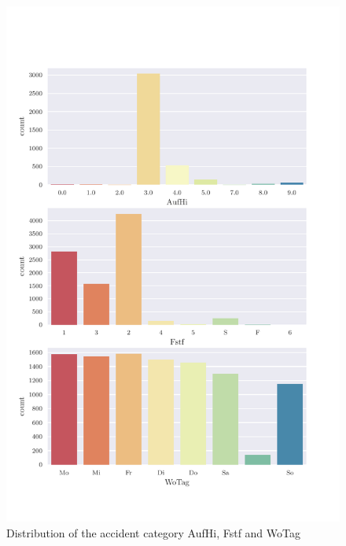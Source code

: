 \documentclass[a4paper,headsepline,footsepline,fontsize=11pt,BCOR=12mm,DIV=12]{report}
\begin{document}
\begin{appendices}
\begin{figure}[h]
	\centering
	\includegraphics[scale=0.7]{../CorrAnalysis/data/BAYSIS/01_dataset/plots/baysis_dataset_count_multiple02}
	\caption{Distribution of the accident category AufHi, Fstf and WoTag}
	\label{img:appendix_baysis_dataset_02}
\end{figure}


\end{appendices}
\end{document}

